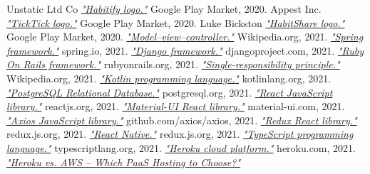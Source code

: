 \documentclass[twoside]{ctuthesis}
\begin{document}
\begin{thebibliography}{99}
            Unstatic Ltd Co
            \href{https://play.google.com/store/apps/details?id=co.unstatic.habitify}{\emph{"Habitify logo."}}
            Google Play Market, 2020.
            Appest Inc.
            \href{https://play.google.com/store/apps/details?id=com.ticktick.task}{\emph{"TickTick logo."}}
            Google Play Market, 2020.
        Luke Bickston
        \href{https://play.google.com/store/apps/details?id=com.habitshareapp}{\emph{"HabitShare logo."}}
        Google Play Market, 2020.
        \href{https://en.wikipedia.org/wiki/Model\%E2\%80\%93view\%E2\%80\%93controller}{\emph{"Model–view–controller."}}
        Wikipedia.org, 2021.
        \href{https://spring.io/}{\emph{"Spring framework."}}
        spring.io, 2021.
        \href{https://www.djangoproject.com/}{\emph{"Django framework."}}
        djangoproject.com, 2021.
        \href{https://spring.io/}{\emph{"Ruby On Rails framework."}}
        rubyonrails.org, 2021.
        \href{https://en.wikipedia.org/wiki/Single-responsibility_principle}{\emph{"Single-responsibility principle."}}
        Wikipedia.org, 2021.
        \href{https://kotlinlang.org/}{\emph{"Kotlin programming language."}}
        kotlinlang.org, 2021.
        \href{https://www.postgresql.org/}{\emph{"PostgreSQL Relational Database."}}
        postgresql.org, 2021.
        \href{https://reactjs.org/}{\emph{"React JavaScript library."}}
        reactjs.org, 2021.
        \href{https://material-ui.com/}{\emph{"Material-UI React library."}}
        material-ui.com, 2021.
        \href{https://github.com/axios/axios}{\emph{"Axios JavaScript library."}}
        github.com/axios/axios, 2021.
        \href{https://redux.js.org/}{\emph{"Redux React library."}}
        redux.js.org, 2021.
        \href{https://reactnative.dev/}{\emph{"React Native."}}
        redux.js.org, 2021.
        \href{https://www.typescriptlang.org/}{\emph{"TypeScript programming language."}}
        typescriptlang.org, 2021.
        \href{https://www.heroku.com/}{\emph{"Heroku cloud platform."}}
        heroku.com, 2021.
        \href{https://railsware.com/blog/heroku-vs-aws-which-paas-hosting-to-choose/}{\emph{"Heroku vs. AWS – Which PaaS Hosting to Choose?"}}

\end{thebibliography}
\end{document}
